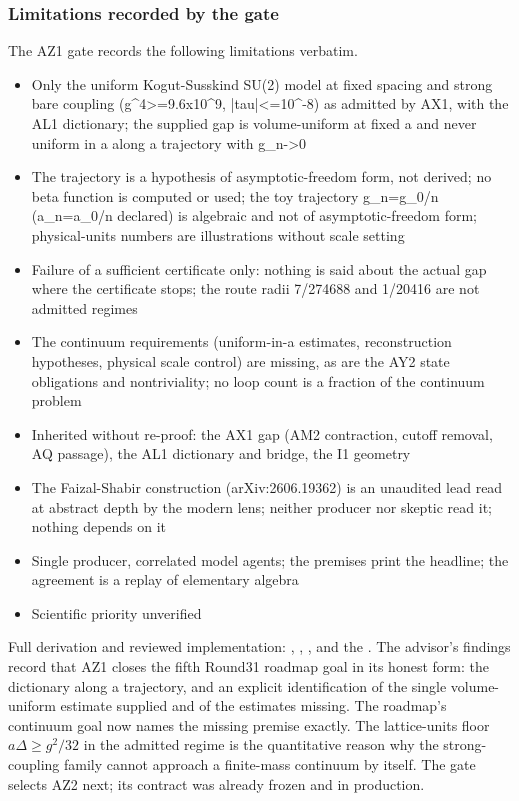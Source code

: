 \subsubsection{Limitations recorded by the gate}
\label{sec:az1-limits}
The AZ1 gate records the following limitations verbatim.
\begin{gatequote}
\begin{itemize}
\item Only the uniform Kogut-Susskind SU(2) model at fixed spacing and strong
bare coupling (g\textasciicircum{}4>=9.6x10\textasciicircum{}9,
|tau|<=10\textasciicircum{}-8) as admitted by AX1, with the AL1 dictionary;
the supplied gap is volume-uniform at fixed a and never uniform in a along a
trajectory with g\_n->0
\item The trajectory is a hypothesis of asymptotic-freedom form, not derived;
no beta function is computed or used; the toy trajectory g\_n=g\_0/n
(a\_n=a\_0/n declared) is algebraic and not of asymptotic-freedom form;
physical-units numbers are illustrations without scale setting
\item Failure of a sufficient certificate only: nothing is said about the
actual gap where the certificate stops; the route radii 7/274688 and 1/20416
are not admitted regimes
\item The continuum requirements (uniform-in-a estimates, reconstruction
hypotheses, physical scale control) are missing, as are the AY2 state
obligations and nontriviality; no loop count is a fraction of the continuum
problem
\item Inherited without re-proof: the AX1 gap (AM2 contraction, cutoff
removal, AQ passage), the AL1 dictionary and bridge, the I1 geometry
\item The Faizal-Shabir construction (arXiv:2606.19362) is an unaudited lead
read at abstract depth by the modern lens; neither producer nor skeptic read
it; nothing depends on it
\item Single producer, correlated model agents; the premises print the
headline; the agreement is a replay of elementary algebra
\item Scientific priority unverified
\end{itemize}
\end{gatequote}
Full derivation and reviewed implementation:
,
,
,
 and the
. The advisor's
findings record that AZ1 closes the fifth Round31 roadmap goal in its honest
form: the dictionary along a trajectory, and an explicit identification of
the single volume-uniform estimate supplied and of the estimates missing. The
roadmap's continuum goal now names the missing premise exactly. The
lattice-units floor $a\Delta\ge g^2/32$ in the admitted regime is the
quantitative reason why the strong-coupling family cannot approach a
finite-mass continuum by itself. The gate selects AZ2 next; its contract was
already frozen and in production.

